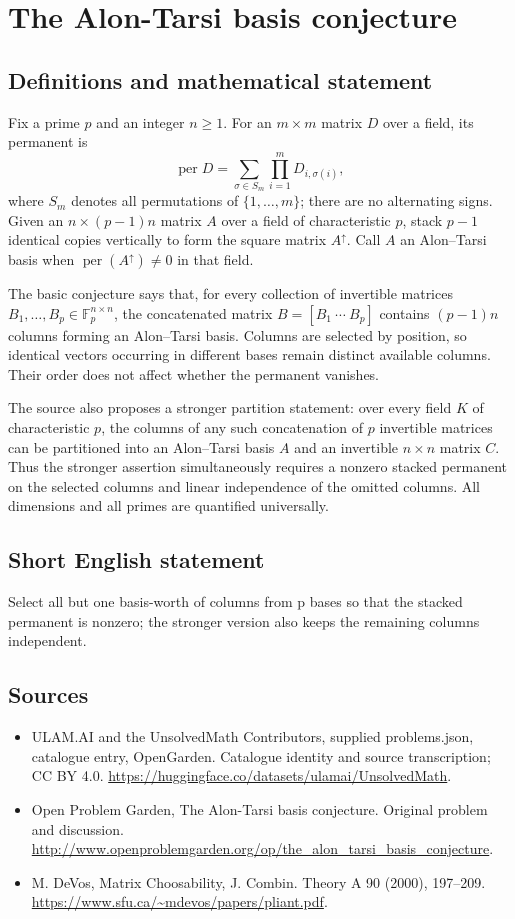 \documentclass[11pt,a4paper]{article}
\begin{document}
\section*{The Alon-Tarsi basis conjecture}\label{statement}

\subsection{Definitions and mathematical statement}
Fix a prime $p$ and an integer $n\ge1$. For an $m\times m$ matrix $D$ over a field, its permanent is
\[
 \operatorname{per}D=\sum_{\sigma\in S_m}\prod_{i=1}^mD_{i,\sigma(i)},
\]
where $S_m$ denotes all permutations of $\{1,\ldots,m\}$; there are no alternating signs. Given an $n\times(p-1)n$ matrix $A$ over a field of characteristic $p$, stack $p-1$ identical copies vertically to form the square matrix $A^{\uparrow}$. Call $A$ an Alon--Tarsi basis when $\operatorname{per}(A^{\uparrow})\ne0$ in that field.

The basic conjecture says that, for every collection of invertible matrices $B_1,\ldots,B_p\in\mathbb F_p^{n\times n}$, the concatenated matrix $B=[B_1\ \cdots\ B_p]$ contains $(p-1)n$ columns forming an Alon--Tarsi basis. Columns are selected by position, so identical vectors occurring in different bases remain distinct available columns. Their order does not affect whether the permanent vanishes.

The source also proposes a stronger partition statement: over every field $K$ of characteristic $p$, the columns of any such concatenation of $p$ invertible matrices can be partitioned into an Alon--Tarsi basis $A$ and an invertible $n\times n$ matrix $C$. Thus the stronger assertion simultaneously requires a nonzero stacked permanent on the selected columns and linear independence of the omitted columns. All dimensions and all primes are quantified universally.
\subsection{Short English statement}
Select all but one basis-worth of columns from p bases so that the stacked permanent is nonzero; the stronger version also keeps the remaining columns independent.
\subsection{Sources}
\begin{itemize}
\item[S1] ULAM.AI and the UnsolvedMath Contributors, supplied problems.json, catalogue entry, OpenGarden. Catalogue identity and source transcription; CC BY 4.0.
\url{https://huggingface.co/datasets/ulamai/UnsolvedMath}.
\item[S2] Open Problem Garden, The Alon-Tarsi basis conjecture. Original problem and discussion.
\url{http://www.openproblemgarden.org/op/the_alon_tarsi_basis_conjecture}.
\item[S3] M. DeVos, Matrix Choosability, J. Combin. Theory A 90 (2000), 197--209.
\url{https://www.sfu.ca/~mdevos/papers/pliant.pdf}.
\end{itemize}
\end{document}
